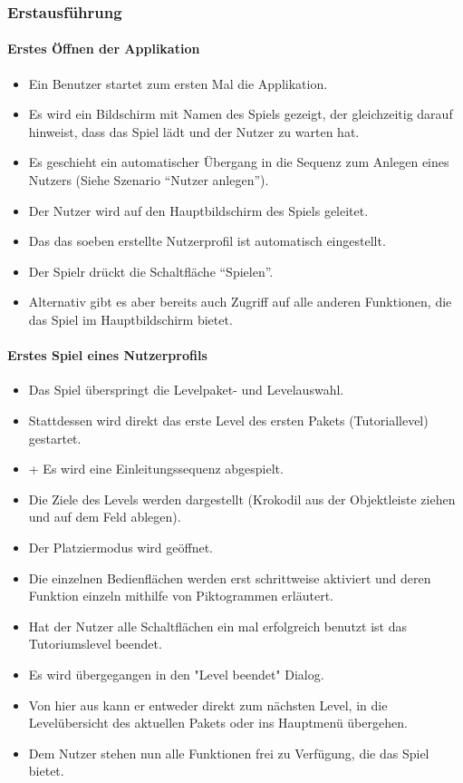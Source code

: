\subsubsection{Erstausführung}
\paragraph{Erstes Öffnen der Applikation}\mbox{}\newline
\begin{itemize}
\item Ein Benutzer startet zum ersten Mal die Applikation. 
\item Es wird ein Bildschirm mit Namen des Spiels gezeigt, der gleichzeitig darauf
hinweist, dass das Spiel lädt und der Nutzer zu warten hat.
\item Es geschieht ein automatischer Übergang in die Sequenz zum
Anlegen eines Nutzers (Siehe Szenario ``Nutzer anlegen'').
\item Der Nutzer wird auf den Hauptbildschirm des Spiels geleitet. 
\item Das das soeben erstellte Nutzerprofil ist automatisch eingestellt.
\item Der Spielr drückt die Schaltfläche ``Spielen''.
\item Alternativ gibt es aber bereits auch Zugriff auf alle anderen Funktionen,
die das Spiel im Hauptbildschirm bietet.
\end{itemize}

\paragraph{Erstes Spiel eines Nutzerprofils}\mbox{}\newline
\begin{itemize}
\item Das Spiel überspringt die Levelpaket- und Levelauswahl.
\item Stattdessen wird direkt das erste Level des ersten Pakets (Tutoriallevel) gestartet.
\item + Es wird eine Einleitungssequenz abgespielt.
\item Die Ziele des Levels werden dargestellt (Krokodil aus der Objektleiste ziehen und auf dem Feld ablegen).
\item Der Platziermodus wird geöffnet.
\item Die einzelnen Bedienflächen werden erst schrittweise aktiviert und deren Funktion
einzeln mithilfe von Piktogrammen erläutert. 
\item Hat der Nutzer alle Schaltflächen ein mal erfolgreich benutzt ist das Tutoriumslevel beendet.
\item Es wird übergegangen in den "Level beendet" Dialog. 
\item Von hier aus kann er entweder direkt zum nächsten Level, in die Levelübersicht des aktuellen Pakets oder
ins Hauptmenü übergehen.
\item Dem Nutzer stehen nun alle Funktionen frei zu Verfügung, die das Spiel 
bietet.
\end{itemize}
